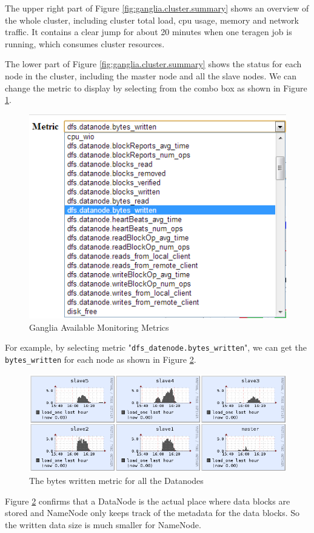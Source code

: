 The upper right part of Figure \ref{fig:ganglia.cluster.summary} shows an overview of the whole cluster, including cluster total load, cpu usage, memory and network traffic. It contains a clear jump for about 20 minutes when one teragen job is running, which consumes cluster resources.

The lower part of Figure \ref{fig:ganglia.cluster.summary} shows the status for each node in the cluster, including the master node and all the slave nodes. We can change the metric to display by selecting from the combo box as shown in Figure \ref{fig:ganglia.metrics}.
\begin{figure}[ht]
  \centering
  \includegraphics[width=.9\textwidth]{figs/5163os_06_09.png}
  \caption{Ganglia Available Monitoring Metrics}\label{fig:ganglia.metrics}
\end{figure} 
For example, by selecting metric "\verb|dfs_datenode.bytes_written|", we can get the \verb|bytes_written| for each node as shown in Figure \ref{fig:bytes.written.metric}.
\begin{figure}[ht]
  \centering
  \includegraphics[width=.9\textwidth]{figs/5163os_06_10.png}
  \caption{The bytes written metric for all the Datanodes}\label{fig:bytes.written.metric}
\end{figure} 
 Figure \ref{fig:bytes.written.metric} confirms that a DataNode is the actual place where data blocks are stored and NameNode only keeps track of the metadata for the data blocks. So the written data size is much smaller for NameNode.

